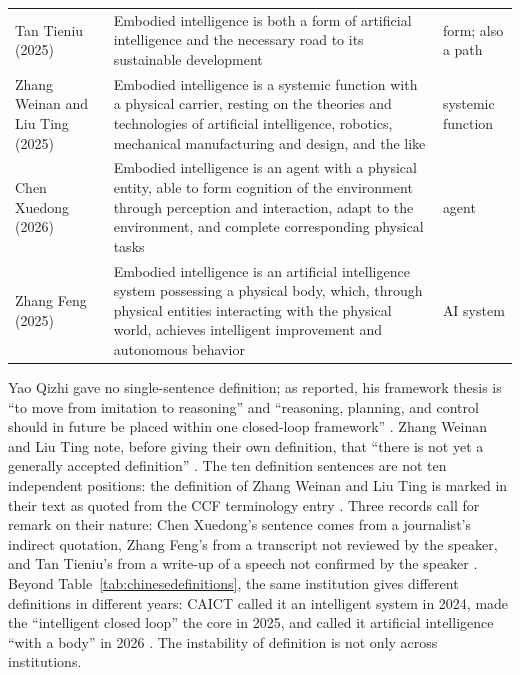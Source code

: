 \documentclass[10pt]{article}
\begin{document}
\begin{table}[htbp]
\begin{tabularx}{\textwidth}{>{\raggedright\arraybackslash}p{3.3cm}Y>{\raggedright\arraybackslash}p{2.6cm}}
Tan Tieniu (2025) \cite{tantn2025} & Embodied intelligence is both a form of artificial intelligence and the necessary road to its sustainable development & form; also a path \\
Zhang Weinan and Liu Ting (2025) \cite{zhangwei2025} & Embodied intelligence is a systemic function with a physical carrier, resting on the theories and technologies of artificial intelligence, robotics, mechanical manufacturing and design, and the like & systemic function \\
Chen Xuedong (2026) \cite{chenxd2026} & Embodied intelligence is an agent with a physical entity, able to form cognition of the environment through perception and interaction, adapt to the environment, and complete corresponding physical tasks & agent \\
Zhang Feng (2025) \cite{zhangfeng2025} & Embodied intelligence is an artificial intelligence system possessing a physical body, which, through physical entities interacting with the physical world, achieves intelligent improvement and autonomous behavior & AI system \\
\bottomrule
\end{tabularx}
\end{table}

Yao Qizhi gave no single-sentence definition; as reported, his framework thesis is ``to move from imitation to reasoning'' and ``reasoning, planning, and control should in future be placed within one closed-loop framework'' \cite{yao2025}. Zhang Weinan and Liu Ting note, before giving their own definition, that ``there is not yet a generally accepted definition'' \cite{zhangwei2025}. The ten definition sentences are not ten independent positions: the definition of Zhang Weinan and Liu Ting is marked in their text as quoted from the CCF terminology entry \cite{zhangwei2025,ccf2023}. Three records call for remark on their nature: Chen Xuedong's sentence comes from a journalist's indirect quotation, Zhang Feng's from a transcript not reviewed by the speaker, and Tan Tieniu's from a write-up of a speech not confirmed by the speaker \cite{chenxd2026,zhangfeng2025,tantn2025}. Beyond Table~\ref{tab:chinesedefinitions}, the same institution gives different definitions in different years: CAICT called it an intelligent system in 2024, made the ``intelligent closed loop'' the core in 2025, and called it artificial intelligence ``with a body'' in 2026 \cite{caict2024,caict2025,caict2026}. The instability of definition is not only across institutions.
\end{document}
